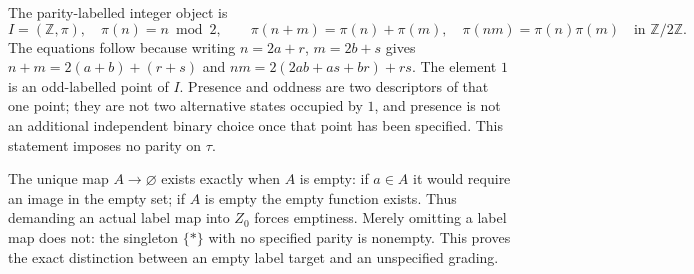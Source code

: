 The parity-labelled integer object is
\begin{equation}\tag{PPI4}
I=(\mathbb Z,\pi),\quad \pi(n)=n\bmod2,\qquad
\pi(n+m)=\pi(n)+\pi(m),\quad
\pi(nm)=\pi(n)\pi(m)\quad\text{in }\mathbb Z/2\mathbb Z.
\end{equation}
The equations follow because writing $n=2a+r$, $m=2b+s$ gives
$n+m=2(a+b)+(r+s)$ and
$nm=2(2ab+as+br)+rs$. The element $1$ is an odd-labelled point of
$I$. Presence and oddness are two descriptors of that one point;
they are not two alternative states occupied by $1$, and presence
is not an additional independent binary choice once that point
has been specified. This statement imposes no parity on $\tau$.

The unique map $A\to\varnothing$ exists exactly when $A$ is empty:
if $a\in A$ it would require an image in the empty set; if $A$ is
empty the empty function exists. Thus demanding an actual label
map into $Z_0$ forces emptiness. Merely omitting a label map does
not: the singleton $\{*\}$ with no specified parity is nonempty.
This proves the exact distinction between an empty label target
and an unspecified grading.

